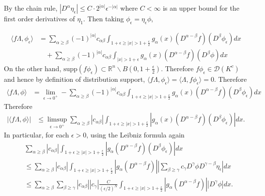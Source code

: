 \documentclass[answers]{exam}
\theoremstyle{problemstyle}
\newcommand{\1}[1]{\textbf{1}_{\left[#1\right]}} %
\def\R{\mathbb{R}} %
\begin{document}
\begin{questions}
\begin{parts}
\begin{solution}
    
    By the chain rule, $|D^{\alpha} \eta_{\epsilon}| \leq C\cdot 2^{|\alpha|}\epsilon^{-|\alpha|}$ where $C<\infty$ is an upper bound for the first order derivatives of $\eta_1$. Then taking $\phi_{\epsilon} = \eta_{\epsilon} \phi$,
    
    
    \begin{align*}
      \langle f\Lambda, \phi_{\epsilon}\rangle
      &= \sum_{\alpha \geq \beta }(-1)^{|\alpha|}c_{\alpha\beta}\int_{1+ \epsilon\geq |x|>1+\frac{\epsilon}{2}} g_{\alpha}(x)(D^{\alpha-\beta}f)(D^{\beta}\phi_{\epsilon})dx\\
      &\quad +  \sum_{\alpha \geq \beta }(-1)^{|\alpha|}c_{\alpha\beta}\int_{|x|>1+\epsilon} g_{\alpha}(x)(D^{\alpha-\beta}f)(D^{\beta}\phi)dx
    \end{align*}
    On the other hand, $\text{supp}(f\phi_{\epsilon}) \subset \R^n\backslash B(0,1+\frac{\epsilon}{2})$. Therefore $f\phi_{\epsilon}\in \mathcal{D}(K^{c})$ and hence by definition of distribution support, $\langle f\Lambda, \phi_{\epsilon}\rangle = \langle \Lambda, f\phi_{\epsilon}\rangle =0$. Therefore
    \begin{align*}
      \langle f\Lambda, \phi \rangle
      &= \lim_{\epsilon\to 0^{+}}-\sum_{\alpha \geq \beta }(-1)^{|\alpha|}c_{\alpha\beta}\int_{1+ \epsilon\geq |x|>1+\frac{\epsilon}{2}} g_{\alpha}(x)(D^{\alpha-\beta}f)(D^{\beta}\phi_{\epsilon})dx
    \end{align*}
    Therefore
    \begin{align} \label{dist-up-bound}
      |\langle f\Lambda, \phi \rangle|
      &\leq \limsup_{\epsilon\to 0^{+}}\sum_{\alpha \geq \beta } |c_{\alpha\beta}|\int_{1+ \epsilon\geq |x|>1+\frac{\epsilon}{2}} \left| g_{\alpha}(x)(D^{\alpha-\beta}f)(D^{\beta}\phi_{\epsilon})\right|dx.
    \end{align}
    In particular, for each $\epsilon>0$, using the Leibniz formula again
    \begin{align*}
    &\sum_{\alpha \geq \beta } |c_{\alpha\beta}|\int_{1+ \epsilon\geq |x|>1+\frac{\epsilon}{2}} \left| g_{\alpha}(D^{\alpha-\beta}f)(D^{\beta}\phi_{\epsilon})\right|dx \\
    &\leq \sum_{\alpha \geq \beta } |c_{\alpha\beta}|\int_{1+ \epsilon\geq |x|>1+\frac{\epsilon}{2}} \left| g_{\alpha}(D^{\alpha-\beta}f)\right|\left|\sum_{\beta\geq \gamma} c_{\gamma} D^{\gamma}\phi  D^{\gamma-\beta}\eta_{\epsilon} \right|dx \\
    &\leq \sum_{\alpha \geq \beta }  \sum_{\beta\geq \gamma} |c_{\alpha\beta}| |c_{\gamma}|\frac{C}{(\epsilon/2)^N}\int_{1+ \epsilon\geq |x|>1+\frac{\epsilon}{2}} \left| g_{\alpha}(D^{\alpha-\beta}f)\right| \left| D^{\gamma}\phi \right|dx.

\end{align*}
\end{solution}
\end{parts}
\end{questions}
\end{document}
